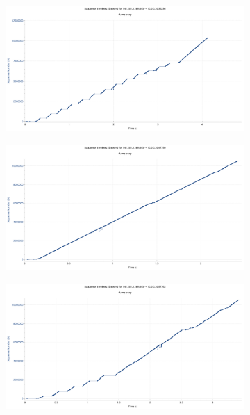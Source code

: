 \documentclass[
    pdftex,
    12pt,
    parskip=half,
    a4paper
]{scrartcl}
\begin{document}
\begin{figure}
	\begin{subfigure}{0.5\textwidth}
		\includegraphics[width=1\textwidth]{../1/wireshark/constant1.pdf}
	\end{subfigure}
	\begin{subfigure}{0.5\textwidth}
		\includegraphics[width=1\textwidth]{../1/wireshark/constant2.pdf}
	\end{subfigure}
	\begin{subfigure}{0.5\textwidth}
		\includegraphics[width=1\textwidth]{../1/wireshark/constant3.pdf}

\end{subfigure}
\end{figure}
\end{document}
